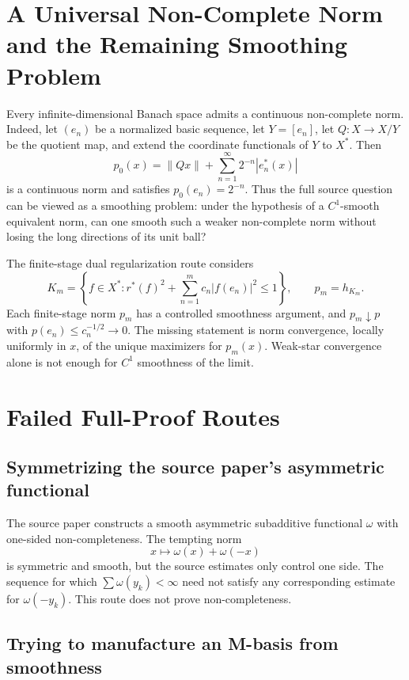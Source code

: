 \documentclass[11pt]{article}
\theoremstyle{remark}
\newcommand{\norm}[1]{\left\lVert #1 \right\rVert}
\begin{document}
\section*{A Universal Non-Complete Norm and the Remaining Smoothing Problem}

Every infinite-dimensional Banach space admits a continuous non-complete norm.
Indeed, let \((e_n)\) be a normalized basic sequence, let
\(Y=[e_n]\), let \(Q:X\to X/Y\) be the quotient map, and extend the coordinate
functionals of \(Y\) to \(X^*\).  Then
\[
        p_0(x)=\norm{Qx}+\sum_{n=1}^\infty 2^{-n}|e_n^*(x)|
\]
is a continuous norm and satisfies \(p_0(e_n)=2^{-n}\).  Thus the full source
question can be viewed as a smoothing problem: under the hypothesis of a
\(C^1\)-smooth equivalent norm, can one smooth such a weaker non-complete norm
without losing the long directions of its unit ball?

The finite-stage dual regularization route considers
\[
        K_m=\left\{f\in X^*:
        r^*(f)^2+\sum_{n=1}^m c_n|f(e_n)|^2\leq 1\right\},
        \qquad p_m=h_{K_m}.
\]
Each finite-stage norm \(p_m\) has a controlled smoothness argument, and
\(p_m\downarrow p\) with \(p(e_n)\leq c_n^{-1/2}\to0\).  The missing statement
is norm convergence, locally uniformly in \(x\), of the unique maximizers
for \(p_m(x)\).  Weak-star convergence alone is not enough for \(C^1\)
smoothness of the limit.

\section*{Failed Full-Proof Routes}

\subsection*{Symmetrizing the source paper's asymmetric functional}

The source paper constructs a smooth asymmetric subadditive functional
\(\omega\) with one-sided non-completeness.  The tempting norm
\[
        x\mapsto \omega(x)+\omega(-x)
\]
is symmetric and smooth, but the source estimates only control one side.
The sequence for which \(\sum\omega(y_k)<\infty\) need not satisfy any
corresponding estimate for \(\omega(-y_k)\).  This route does not prove
non-completeness.

\subsection*{Trying to manufacture an M-basis from smoothness}
\end{document}
